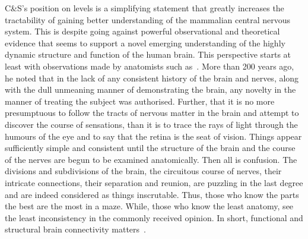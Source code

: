 \documentclass[11pt,3p,twocolumn]{JMN}
\begin{document}
C\&S's position on levels is a simplifying statement that greatly increases the tractability of gaining better understanding of the mammalian central nervous system. This is despite going against powerful observational and theoretical evidence that seems to support a novel emerging understanding of the highly dynamic structure and function of the human brain. This perspective starts at least with observations made by anatomists such as~\citet{bell11}. More than 200 years ago, he noted that in the lack of any consistent history of the brain and nerves, along with the dull unmeaning manner of demonstrating the brain, any novelty in the manner of treating the subject was authorised. Further, that it is no more presumptuous to follow the tracts of nervous matter in the brain and attempt to discover the course of sensations, than it is to trace the rays of light through the humours of the eye and to say that the retina is the seat of vision. Things appear sufficiently simple and consistent until the structure of the brain and the course of the nerves are begun to be examined anatomically. Then all is confusion. The divisions and subdivisions of the brain, the circuitous course of nerves, their intricate connections, their separation and reunion, are puzzling in the last degree and are indeed considered as things inscrutable. Thus, those who know the parts the best are the most in a maze. While, those who know the least anatomy, see the least inconsistency in the commonly received opinion. In short, functional and structural brain connectivity matters~\citep{gili18}.
\end{document}
